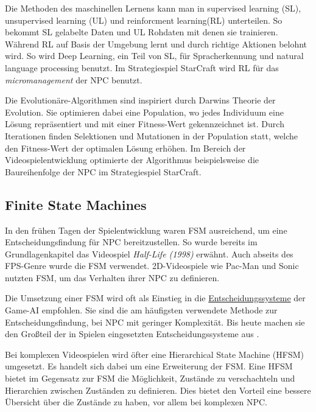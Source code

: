 Die Methoden des maschinellen Lernens kann man in supervised learning (SL), unsupervised learning (UL) und reinforcment learning(RL) unterteilen. So bekommt SL gelabelte Daten und UL Rohdaten mit denen sie trainieren. W\"{a}hrend RL auf Basis der Umgebung lernt und durch richtige Aktionen belohnt wird. So wird Deep Learning, ein Teil von SL, f\"{u}r Spracherkennung und natural language processing benutzt. Im Strategiespiel StarCraft wird RL f\"{u}r das \textit{micromanagement} der NPC benutzt. \autocite{inbook}

Die Evolution\"{a}re-Algorithmen sind inspiriert durch Darwins Theorie der Evolution. Sie optimieren dabei eine Population, wo jedes Individuum eine L\"{o}sung repr\"{a}sentiert und mit einer Fitness-Wert gekennzeichnet ist. Durch Iterationen finden Selektionen und Mutationen in der Population statt, welche den Fitness-Wert der optimalen L\"{o}sung erh\"{o}hen. Im Bereich der Videospielentwicklung optimierte der Algorithmus beispielsweise die Baureihenfolge der NPC im Strategiespiel StarCraft. \autocite{inbook}


\subsection{Finite State Machines}
\label{chap:fsm sota}

In den fr\"{u}hen Tagen der Spielentwicklung waren FSM ausreichend, um eine Entscheidungsfindung f\"{u}r NPC bereitzustellen. So wurde bereits im Grundlagenkapitel das Videospiel \textit{Half-Life (1998)} erw\"{a}hnt. Auch abseits des FPS-Genre wurde die FSM verwendet. 2D-Videospiele wie Pac-Man und Sonic nutzten FSM, um das Verhalten ihrer NPC zu definieren. \autocite{U2023}

Die Umsetzung einer FSM wird oft als Einstieg in die \hyperref[chap:entscheidungssysteme]{Entscheidungssysteme} der Game-AI empfohlen. Sie sind die am h\"{a}ufigsten verwendete Methode zur Entscheidungsfindung, bei NPC mit geringer Komplexit\"{a}t. Bis heute machen sie den Gro\ss{}teil der in Spielen eingesetzten Entscheidungssysteme aus \autocite{AIgames}.

Bei komplexen Videospielen wird \"{o}fter eine Hierarchical State Machine (HFSM) umgesetzt. Es handelt sich dabei um eine Erweiterung der FSM. Eine HFSM bietet im Gegensatz zur FSM die M\"{o}glichkeit, Zust\"{a}nde zu verschachteln und Hierarchien zwischen Zust\"{a}nden zu definieren. Dies bietet den Vorteil eine bessere \"{U}bersicht \"{u}ber die Zust\"{a}nde zu haben, vor allem bei komplexen NPC. \autocite{AIgames}



